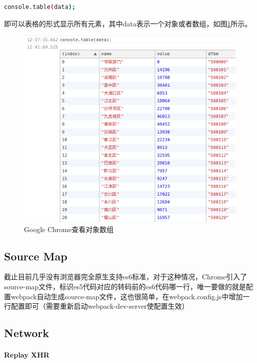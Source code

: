 \documentclass[letter]{book}
\begin{document}
\begin{lstlisting}[language=Bash]
console.table(data);
\end{lstlisting}

即可以表格的形式显示所有元素，其中data表示一个对象或者数组，如图\ref{fig:googlechromeconsoletable}所示。

\begin{figure}[htbp]
	\centering
	\includegraphics[scale=0.5]{googlechromeconsoletable.png}
	\caption{Google Chrome查看对象数组}
	\label{fig:googlechromeconsoletable}
\end{figure}


\subsection{Source Map}

截止目前几乎没有浏览器完全原生支持es6标准，对于这种情况，Chrome引入了source-map文件，标识es5代码对应的转码前的es6代码哪一行，唯一要做的就是配置webpack自动生成source-map文件，这也很简单，在webpack.config.js中增加一行配置即可（需要重新启动webpack-dev-server使配置生效）


\subsection{Network}

\paragraph{Replay XHR}
\end{document}
